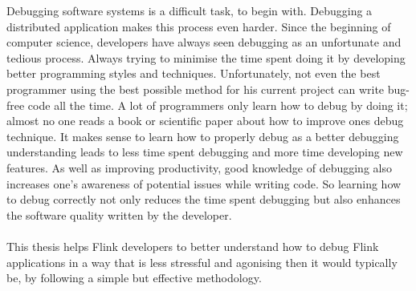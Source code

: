 Debugging software systems is a difficult task, to begin with. Debugging a distributed application makes this process even harder. Since the beginning of computer science, developers have always seen debugging as an unfortunate and tedious process. Always trying to minimise the time spent doing it by developing better programming styles and techniques. Unfortunately, not even the best programmer using the best possible method for his current project can write bug-free code all the time. A lot of programmers only learn how to debug by doing it; almost no one reads a book or scientific paper about how to improve ones debug technique. It makes sense to learn how to properly debug as a better debugging understanding leads to less time spent debugging and more time developing new features. As well as improving productivity, good knowledge of debugging also increases one's awareness of potential issues while writing code. So learning how to debug correctly not only reduces the time spent debugging but also enhances the software quality written by the developer.

\paragraph{} This thesis helps Flink developers to better understand how to debug Flink applications in a way that is less stressful and agonising then it would typically be, by following a simple but effective methodology.
